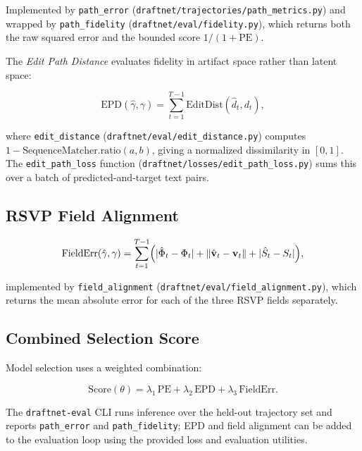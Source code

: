 \documentclass[12pt,a4paper]{article}
\theoremstyle{draftthm}
\newcommand{\traj}{\gamma}
\newcommand{\norm}[1]{\left\|#1\right\|}
\newcommand{\code}[1]{\texttt{\small #1}}
\begin{document}
Implemented by \code{path\_error} (\code{draftnet/trajectories/path\_metrics.py}) and wrapped by \code{path\_fidelity} (\code{draftnet/eval/fidelity.py}), which returns both the raw squared error and the bounded score $1/(1+\mathrm{PE})$.

The \emph{Edit Path Distance} evaluates fidelity in artifact space rather than latent space:

\begin{equation}
  \mathrm{EPD}(\hat\traj, \traj)
  =
  \sum_{t=1}^{T-1}
  \mathrm{EditDist}(\hat{d}_t, d_t),
  \label{eq:epd}
\end{equation}

where \code{edit\_distance} (\code{draftnet/eval/edit\_distance.py}) computes $1 - \mathrm{SequenceMatcher.ratio}(a, b)$, giving a normalized dissimilarity in $[0,1]$. The \code{edit\_path\_loss} function (\code{draftnet/losses/edit\_path\_loss.py}) sums this over a batch of predicted-and-target text pairs.

\subsection{RSVP Field Alignment}

\begin{equation}
  \mathrm{FieldErr}(\hat\traj, \traj)
  =
  \sum_{t=1}^{T-1}
  \Bigl(
  |\hat\Phi_t - \Phi_t|
  + \norm{\hat{\mathbf{v}}_t - \mathbf{v}_t}
  + |\hat{S}_t - S_t|
  \Bigr),
  \label{eq:field-error}
\end{equation}

implemented by \code{field\_alignment} (\code{draftnet/eval/field\_alignment.py}), which returns the mean absolute error for each of the three RSVP fields separately.

\subsection{Combined Selection Score}

Model selection uses a weighted combination:

\begin{equation}
  \mathrm{Score}(\theta)
  =
  \lambda_1\, \mathrm{PE}
  +
  \lambda_2\, \mathrm{EPD}
  +
  \lambda_3\, \mathrm{FieldErr}.
  \label{eq:combined-score}
\end{equation}

The \code{draftnet-eval} CLI runs inference over the held-out trajectory set and reports \code{path\_error} and \code{path\_fidelity}; EPD and field alignment can be added to the evaluation loop using the provided loss and evaluation utilities.
\end{document}
